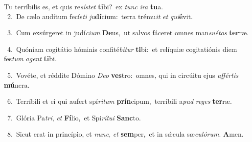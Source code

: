 \lettrine{\initial\textcolor{\initialcolor}{T}}{u} terríbilis es, et quis re\-\textit{sís}\-\textit{tet} \textbf{ti}\-bi?~\star ex \textit{tunc} \textit{i}\-\textit{ra} \textbf{tu}\-a.\\
{\numbfont\textcolor{\numbcolor}{~2.}}~De cælo audítum fecís\textit{ti} \textit{ju}\-\textbf{dí}cium:~\star terra trému\textit{it} \textit{et} \textit{qui}\-\textbf{é}vit.\par
{\numbfont\textcolor{\numbcolor}{~3.}}~Cum exsúrgeret in judí\-\textit{ci}\-\textit{um} \textbf{De}\-us,~\star ut salvos fáceret omnes man\-\textit{su}\-\textit{é}\textit{tos} \textbf{ter}\-ræ.\par
{\numbfont\textcolor{\numbcolor}{~4.}}~Quóniam cogitátio hóminis confité\-\textit{bi}\-\textit{tur} \textbf{ti}\-bi:~\star et relíquiæ cogitatiónis diem fes\textit{tum} \textit{a}\-\textit{gent} \textbf{ti}\-bi.\par
{\numbfont\textcolor{\numbcolor}{~5.}}~Vovéte, et réddite Dómino \textit{De}\-\textit{o} \textbf{ves}\-tro:~\star omnes, qui in circúitu ejus \textit{af}\-\textit{fér}\textit{tis} \textbf{mú}\-nera.\par
{\numbfont\textcolor{\numbcolor}{~6.}}~Terríbili et ei qui aufert spí\-\textit{ri}\-\textit{tum} \textbf{prín}\-cipum,~\star terríbili a\textit{pud} \textit{re}\-\textit{ges} \textbf{ter}\-ræ.\par
{\numbfont\textcolor{\numbcolor}{~7.}}~Glória Pa\-\textit{tri}\-, \textit{et} \textbf{Fí}\-lio,~\star et Spi\-\textit{rí}\-\textit{tu}\textit{i} \textbf{Sanc}\-to.\par
{\numbfont\textcolor{\numbcolor}{~8.}}~Sicut erat in princípio, et \textit{nunc}\-, \textit{et} \textbf{sem}\-per,~\star et in sǽcula sæ\-\textit{cu}\-\textit{ló}\textit{rum}. \textbf{A}\-men.\par
